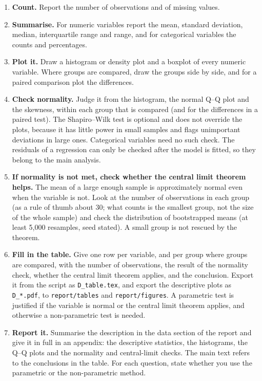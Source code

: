 \documentclass[11pt,a4paper]{article}
\begin{document}
\begin{enumerate}
	\item \textbf{Count.} Report the number of observations and of missing values.
	\item \textbf{Summarise.} For numeric variables report the mean, standard deviation, median, interquartile range and range, and for categorical variables the counts and percentages.
	\item \textbf{Plot it.} Draw a histogram or density plot and a boxplot of every numeric variable. Where groups are compared, draw the groups side by side, and for a paired comparison plot the differences.
	\item \textbf{Check normality.} Judge it from the histogram, the normal Q--Q plot and the skewness, within each group that is compared (and for the differences in a paired test). The Shapiro--Wilk test is optional and does not override the plots, because it has little power in small samples and flags unimportant deviations in large ones. Categorical variables need no such check. The residuals of a regression can only be checked after the model is fitted, so they belong to the main analysis.
	\item \textbf{If normality is not met, check whether the central limit theorem helps.} The mean of a large enough sample is approximately normal even when the variable is not. Look at the number of observations in each group (as a rule of thumb about 30; what counts is the smallest group, not the size of the whole sample) and check the distribution of bootstrapped means (at least 5{,}000 resamples, seed stated). A small group is not rescued by the theorem.
	\item \textbf{Fill in the table.} Give one row per variable, and per group where groups are compared, with the number of observations, the result of the normality check, whether the central limit theorem applies, and the conclusion. Export it from the script as \texttt{D\_table.tex}, and export the descriptive plots as \texttt{D\_*.pdf}, to \texttt{report/tables} and \texttt{report/figures}. A parametric test is justified if the variable is normal or the central limit theorem applies, and otherwise a non-parametric test is needed.
	\item \textbf{Report it.} Summarise the description in the data section of the report and give it in full in an appendix: the descriptive statistics, the histograms, the Q--Q plots and the normality and central-limit checks. The main text refers to the conclusions in the table. For each question, state whether you use the parametric or the non-parametric method.
\end{enumerate}
\end{document}
